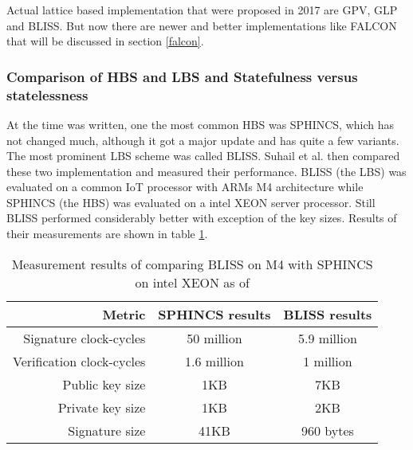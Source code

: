 \documentclass[conference]{IEEEtran}
\begin{document}
Actual lattice based implementation that were proposed in 2017 are GPV, GLP and BLISS. But now there are newer and better implementations like FALCON that will be discussed in section \ref{falcon}.

\subsubsection{Comparison of HBS and LBS and Statefulness versus statelessness}
At the time \cite{QR_sigs} was written, one the most common HBS was SPHINCS, which has not changed much, although it got a major update and has quite a few variants.
The most prominent LBS scheme was called BLISS.
Suhail et al. then compared these two implementation and measured their performance.
BLISS (the LBS) was evaluated on a common IoT processor with ARMs M4 architecture while SPHINCS (the HBS) was evaluated on a intel XEON server processor. Still BLISS performed considerably better with exception of the key sizes. Results of their measurements are shown in table \ref{t:sphincsVSbliss}.

\begin{table}[]
    \centering
    \caption{Measurement results of comparing BLISS on M4 with SPHINCS on intel XEON as of \cite{QR_sigs}}
    \label{t:sphincsVSbliss}
    \begin{tabular}{|r | c  c|}
        \hline
        Metric & SPHINCS results & BLISS results\\
        \hline
        Signature clock-cycles & 50 million & 5.9 million \\
        Verification clock-cycles & 1.6 million & 1 million \\
        Public key size & 1KB & 7KB \\
        Private key size & 1KB & 2KB \\
        Signature size & 41KB & 960 bytes \\
        \hline
    \end{tabular}
\end{table}
\end{document}
